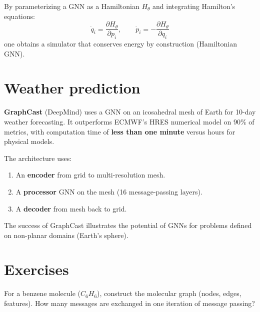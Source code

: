 \begin{theorem}
By parameterizing a GNN as a Hamiltonian $H_\theta$ and integrating
Hamilton's equations:
\[
  \dot{q}_i = \frac{\partial H_\theta}{\partial p_i}, \qquad
  \dot{p}_i = -\frac{\partial H_\theta}{\partial q_i}
\]
one obtains a simulator that conserves energy by construction
(Hamiltonian GNN).
\end{theorem}

\section{Weather prediction}
\label{sec:weather}

\begin{example}
\textbf{GraphCast} (DeepMind) uses a GNN on an icosahedral mesh
of Earth for 10-day weather forecasting. It outperforms ECMWF's
HRES numerical model on $90\%$ of metrics, with computation time
of \textbf{less than one minute} versus hours for physical models.

The architecture uses:
\begin{enumerate}
  \item An \textbf{encoder} from grid to multi-resolution mesh.
  \item A \textbf{processor} GNN on the mesh (16 message-passing
        layers).
  \item A \textbf{decoder} from mesh back to grid.
\end{enumerate}
\end{example}

\begin{remark}
The success of GraphCast illustrates the potential of GNNs for
problems defined on non-planar domains (Earth's sphere).
\end{remark}

\section{Exercises}

\begin{exercise}
For a benzene molecule ($C_6H_6$), construct the molecular graph
(nodes, edges, features). How many messages are exchanged in one
iteration of message passing?
\end{exercise}

